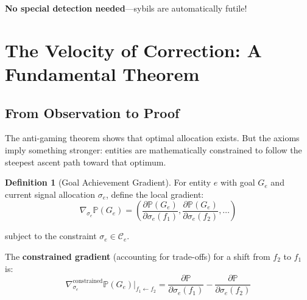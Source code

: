 \documentclass[11pt,a4paper]{article}
\theoremstyle{definition}
\newtheorem{definition}[theorem]{Definition}
\theoremstyle{remark}
\newcommand{\C}{\mathcal{C}}
\begin{document}
\textbf{No special detection needed}—sybils are automatically futile!

\section{The Velocity of Correction: A Fundamental Theorem}

\subsection{From Observation to Proof}

The anti-gaming theorem shows that optimal allocation exists. But the axioms imply something stronger: entities are mathematically constrained to follow the steepest ascent path toward that optimum.

\begin{definition}[Goal Achievement Gradient]
For entity $e$ with goal $G_e$ and current signal allocation $\sigma_e$, define the local gradient:
\[ \nabla_{\sigma_e} \mathbb{P}(G_e) = \left( \frac{\partial \mathbb{P}(G_e)}{\partial \sigma_e(f_1)}, \frac{\partial \mathbb{P}(G_e)}{\partial \sigma_e(f_2)}, \ldots \right) \]

subject to the constraint $\sigma_e \in \C_e$.

The \textbf{constrained gradient} (accounting for trade-offs) for a shift from $f_2$ to $f_1$ is:
\[ \nabla_{\sigma_e}^{\text{constrained}} \mathbb{P}(G_e) \bigg|_{f_1 \leftarrow f_2} = \frac{\partial \mathbb{P}}{\partial \sigma_e(f_1)} - \frac{\partial \mathbb{P}}{\partial \sigma_e(f_2)} \]
\end{definition}
\end{document}
